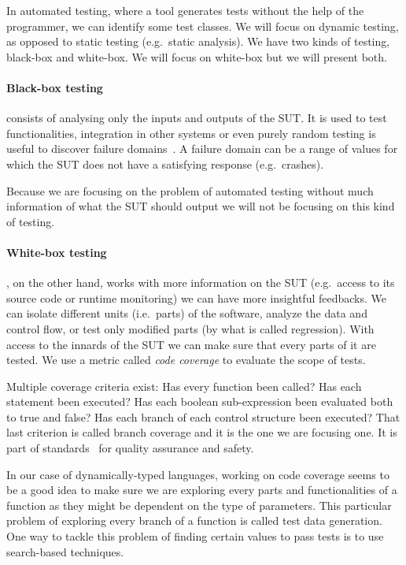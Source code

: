 \documentclass{llncs2e/llncs}
\begin{document}
In automated testing, where a tool generates tests without the help of the
programmer, we can identify some test classes. We will focus on dynamic testing,
as opposed to static testing (e.g.\ static analysis). We have two kinds of
testing, black-box and white-box. We will focus on white-box but we will present
both.

\paragraph{Black-box testing} consists of analysing only the inputs and
outputs of the SUT\@. It is used to test functionalities, integration in other
systems or even purely random testing is useful to discover failure
domains~\cite{ahmad2014new}. A failure domain can be a range of values for which
the SUT does not have a satisfying response (e.g.\ crashes).

Because we are focusing on the problem of automated testing without much
information of what the SUT should output we will not be focusing on this kind
of testing.

\paragraph{White-box testing}, on the other hand, works with more information on
the SUT (e.g.\ access to its source code or runtime monitoring) we can have more
insightful feedbacks. We can isolate different units (i.e.\ parts) of the
software, analyze the data and control flow, or test only modified parts (by
what is called regression).  With access to the innards of the SUT we can make
sure that every parts of it are tested. We use a metric called \textit{code
coverage} to evaluate the scope of tests.

Multiple coverage criteria exist: Has every function been called? Has each
statement been executed? Has each boolean sub-expression been evaluated both to
true and false? Has each branch of each control structure been executed? That
last criterion is called branch coverage and it is the one we are focusing one.
It is part of standards~\cite{BSI98,RTCA92} for quality assurance and safety.

In our case of dynamically-typed languages, working on code coverage seems to be
a good idea to make sure we are exploring every parts and functionalities of a
function as they might be dependent on the type of parameters. This particular
problem of exploring every branch of a function is called test data generation.
One way to tackle this problem of finding certain values to pass tests is to use
search-based techniques.
\end{document}

